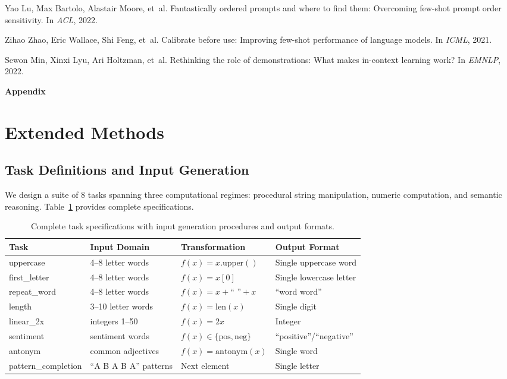 \documentclass[sigconf,anonymous]{acmart}
\begin{document}
\begin{thebibliography}{26}
Yao Lu, Max Bartolo, Alastair Moore, et~al.
\newblock Fantastically ordered prompts and where to find them: Overcoming few-shot prompt order sensitivity.
\newblock In \emph{ACL}, 2022.

Zihao Zhao, Eric Wallace, Shi Feng, et~al.
\newblock Calibrate before use: Improving few-shot performance of language models.
\newblock In \emph{ICML}, 2021.

Sewon Min, Xinxi Lyu, Ari Holtzman, et~al.
\newblock Rethinking the role of demonstrations: What makes in-context learning work?
\newblock In \emph{EMNLP}, 2022.

\end{thebibliography}

\newpage
\appendix
\begin{center}
\Large\textbf{Appendix}
\end{center}
\vspace{1em}

\section{Extended Methods}
\label{app:methods}

\subsection{Task Definitions and Input Generation}

We design a suite of 8 tasks spanning three computational regimes: procedural string manipulation, numeric computation, and semantic reasoning. Table~\ref{tab:task_details} provides complete specifications.

\begin{table}[h]
\centering
\small
\caption{Complete task specifications with input generation procedures and output formats.}
\label{tab:task_details}
\begin{tabular}{@{}llll@{}}
\toprule
Task & Input Domain & Transformation & Output Format \\
\midrule
uppercase & 4--8 letter words & $f(x) = x.\text{upper}()$ & Single uppercase word \\
first\_letter & 4--8 letter words & $f(x) = x[0]$ & Single lowercase letter \\
repeat\_word & 4--8 letter words & $f(x) = x + \text{`` ''} + x$ & ``word word'' \\
length & 3--10 letter words & $f(x) = \text{len}(x)$ & Single digit \\
linear\_2x & integers 1--50 & $f(x) = 2x$ & Integer \\
sentiment & sentiment words & $f(x) \in \{\text{pos}, \text{neg}\}$ & ``positive''/``negative'' \\
antonym & common adjectives & $f(x) = \text{antonym}(x)$ & Single word \\
pattern\_completion & ``A B A B A'' patterns & Next element & Single letter \\
\bottomrule
\end{tabular}
\end{table}
\end{document}
